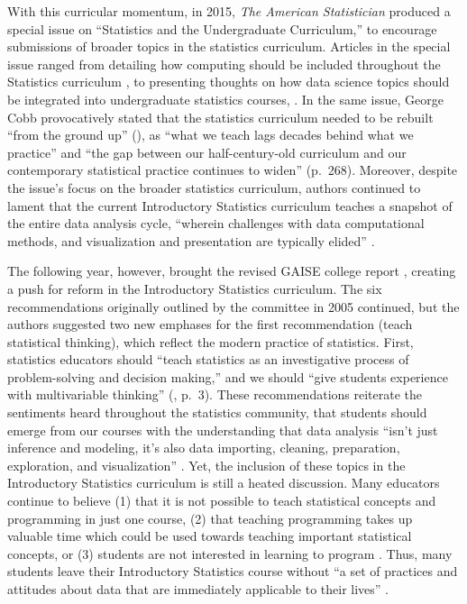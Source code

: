 \documentclass[12pt]{article}
\begin{document}
\quad With this curricular momentum, in 2015, \emph{The American Statistician} 
produced a special issue on ``Statistics and the Undergraduate Curriculum,'' to
encourage submissions of broader topics in the statistics curriculum. Articles 
in the special issue ranged from detailing how computing should be included 
throughout the Statistics curriculum \citep{jenny, tintle, hesterberg}, to 
presenting thoughts on how data science topics should be integrated into 
undergraduate statistics courses, \citep{nolan-data-analysis, grimshaw, 
baumer_datascience, hardin}. In the same issue, George Cobb provocatively stated
that the statistics curriculum needed to be rebuilt ``from the ground up'' 
(\citeyear{cobb}), as ``what we teach lags decades behind what we practice'' and
``the gap between our half-century-old curriculum and our contemporary 
statistical practice continues to widen'' (p.\ 268). Moreover, despite the 
issue's focus on the broader statistics curriculum, authors continued to lament 
that the current Introductory Statistics curriculum teaches a snapshot of the 
entire data analysis cycle, ``wherein challenges with data computational 
methods, and visualization and presentation are typically elided'' 
\citep[p.\ 336]{baumer_datascience}. 

\quad The following year, however, brought the revised GAISE college report 
\citep{gaise}, creating a push for reform in the Introductory Statistics 
curriculum. The six recommendations originally outlined by the committee in 2005
continued, but the authors suggested two new emphases for the first
recommendation (teach statistical thinking), which reflect the modern practice
of statistics. First, statistics educators should ``teach statistics as an
investigative process of problem-solving and decision making,'' and we should 
``give students experience with multivariable thinking'' (\citeyear{gaise}, 
p.\ 3). These recommendations reiterate the sentiments heard throughout the
statistics community, that students should emerge from our courses with the
understanding that data analysis ``isn't just inference and modeling, it's also
data importing, cleaning, preparation, exploration, and visualization'' 
\citep{mine-jsm}. Yet, the inclusion of these topics in the Introductory 
Statistics curriculum is still a heated discussion. Many educators continue to 
believe (1) that it is not possible to teach statistical concepts and 
programming in just one course, (2) that teaching programming takes up valuable
time which could be used towards teaching important statistical concepts, or 
(3) students are not interested in learning to program \citep{mine-jsm}. Thus, 
many students leave their Introductory Statistics course without ``a set of 
practices and attitudes about data that are immediately applicable to their 
lives'' \citep[p.\ 309]{gould}. 
\end{document}
